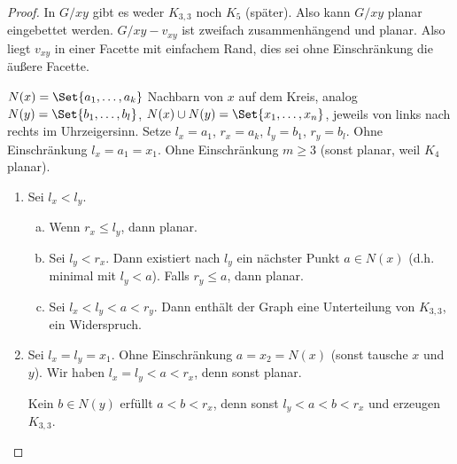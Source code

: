 \begin{st}[Kuratowski, 1930]
\begin{proof}
        In $G / xy$ gibt es weder $K_{3,3}$ noch $K_5$ (später).
        Also kann $G / xy$ planar eingebettet werden.
        $G / xy - v_{xy}$ ist zweifach zusammenhängend und planar.
        Also liegt $v_{xy}$ in einer Facette mit einfachem Rand, dies sei ohne Einschränkung die äußere Facette.


        $N(x) = \Set{a_1, \dotsc, a_k}$ Nachbarn von $x$ auf dem Kreis, analog $N(y) = \Set{b_1, \dotsc, b_l}$, $N(x) \cup N(y) = \Set{x_1, \dotsc, x_n}$, jeweils von links nach rechts im Uhrzeigersinn.
        Setze $l_x = a_1$, $r_x = a_k$, $l_y = b_1$, $r_y = b_l$.
        Ohne Einschränkung $l_x = a_1 = x_1$.
        Ohne Einschränkung $m \ge 3$ (sonst planar, weil $K_4$ planar).
        \begin{enumerate}[1)]
            \item
                Sei $l_x < l_y$.
                \begin{enumerate}[a)]
                    \item
                        Wenn $r_x \le l_y$, dann planar.
                    \item
                        Sei $l_y < r_x$.
                        Dann existiert nach $l_y$ ein nächster Punkt $a \in N(x)$ (d.h. minimal mit $l_y < a$).
                        Falls $r_y \le a$, dann planar.
                    \item
                        Sei $l_x < l_y < a < r_y$.
                        Dann enthält der Graph eine Unterteilung von $K_{3,3}$, ein Widerspruch.
                \end{enumerate}
            \item
                Sei $l_x = l_y = x_1$.
                Ohne Einschränkung $a = x_2 = N(x)$ (sonst tausche $x$ und $y$).
                Wir haben $l_x = l_y < a < r_x$, denn sonst planar.

                Kein $b \in N(y)$ erfüllt $a < b < r_x$, denn sonst $l_y < a < b < r_x$ und erzeugen $K_{3,3}$.


\end{enumerate}
\end{proof}
\end{st}
